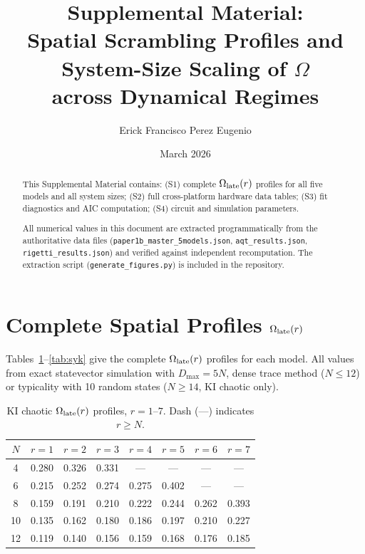 \documentclass[twocolumn,showpacs,preprintnumbers,amsmath,amssymb,aps,prl]{revtex4-2}
\begin{document}
\title{Supplemental Material:\\
Spatial Scrambling Profiles and System-Size Scaling of $\Omega$\\
across Dynamical Regimes}

\author{Erick Francisco Perez Eugenio}

\date{March 2026}

\begin{abstract}
This Supplemental Material contains: (S1) complete $\Omega_{\rm late}(r)$
profiles for all five models and all system sizes; (S2) full cross-platform
hardware data tables; (S3) fit diagnostics and AIC computation; (S4) circuit and
simulation parameters.

All numerical values in this document are extracted programmatically from the
authoritative data files (\texttt{paper1b\_master\_5models.json},
\texttt{aqt\_results.json}, \texttt{rigetti\_results.json}) and verified against
independent recomputation. The extraction script (\texttt{generate\_figures.py})
is included in the repository.
\end{abstract}

\maketitle

\section{Complete Spatial Profiles $\Omega_{\rm late}(r)$}

Tables~\ref{tab:kichaotic1}--\ref{tab:syk} give the complete
$\Omega_{\rm late}(r)$ profiles for each model. All values from exact statevector
simulation with $D_{\max} = 5N$, dense trace method ($N \leq 12$) or typicality
with 10 random states ($N \geq 14$, KI chaotic only).

\begin{table}[h]
\caption{KI chaotic $\Omega_{\rm late}(r)$ profiles, $r = 1$--$7$. Dash (\mbox{---})
indicates $r \geq N$.}
\label{tab:kichaotic1}
\begin{ruledtabular}
\begin{tabular}{cccccccc}
$N$ & $r{=}1$ & $r{=}2$ & $r{=}3$ & $r{=}4$ & $r{=}5$ & $r{=}6$ & $r{=}7$ \\
\hline
4  & 0.280 & 0.326 & 0.331 & ---   & ---   & ---   & ---   \\
6  & 0.215 & 0.252 & 0.274 & 0.275 & 0.402 & ---   & ---   \\
8  & 0.159 & 0.191 & 0.210 & 0.222 & 0.244 & 0.262 & 0.393 \\
10 & 0.135 & 0.162 & 0.180 & 0.186 & 0.197 & 0.210 & 0.227 \\
12 & 0.119 & 0.140 & 0.156 & 0.159 & 0.168 & 0.176 & 0.185 \\
\end{tabular}
\end{ruledtabular}
\end{table}
\end{document}
